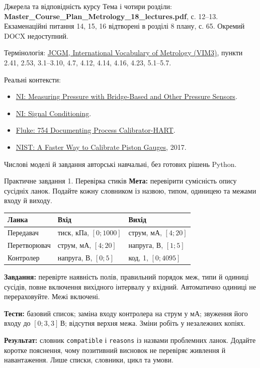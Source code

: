 \documentclass[aspectratio=169,11pt]{beamer}
\newcommand{\unit}[1]{\,\text{#1}}
\begin{document}
\begin{frame}{Джерела та відповідність курсу}
\small
Тема і чотири розділи: \textbf{Master\_Course\_Plan\_Metrology\_18\_lectures.pdf}, с. 12--13. Екзаменаційні питання 14, 15, 16 відтворені в розділі 8 плану, с. 65. Окремий DOCX недоступний.
\medskip

Термінологія: \href{https://jcgm.bipm.org/vim/en/}{JCGM, International Vocabulary of Metrology (VIM3)}, пункти 2.41, 2.53, 3.1--3.10, 4.7, 4.12, 4.14, 4.16, 4.23, 5.1--5.7.
\medskip

Реальні контексти:
\begin{itemize}
\item \href{https://www.ni.com/en/shop/data-acquisition/sensor-fundamentals/measuring-pressure-with-bridge-based-and-other-pressure-sensors.html}{NI: Measuring Pressure with Bridge-Based and Other Pressure Sensors}.
\item \href{https://www.ni.com/docs/en-US/bundle/ni-daqmx/page/sigcon.html}{NI: Signal Conditioning}.
\item \href{https://www.fluke.com/en-gb/product/calibration-tools/multifunction-calibrators/fluke-754}{Fluke: 754 Documenting Process Calibrator-HART}.
\item \href{https://www.nist.gov/news-events/news/2017/05/faster-way-calibrate-piston-gauges}{NIST: A Faster Way to Calibrate Piston Gauges}, 2017.
\end{itemize}
Числові моделі й завдання авторські навчальні, без готових рішень Python.
\end{frame}

\appendix
\begin{frame}[t]{Практичне завдання 1. Перевірка стиків}
\small
\textbf{Мета:} перевірити сумісність опису сусідніх ланок. Подайте кожну словником із назвою, типом, одиницею та межами входу й виходу.
\begin{center}\begin{tabular}{lll}\toprule
Ланка & Вхід & Вихід\\\midrule
Передавач & тиск, кПа, $[0;1000]$ & струм, мА, $[4;20]$\\
Перетворювач & струм, мА, $[4;20]$ & напруга, В, $[1;5]$\\
Контролер & напруга, В, $[0;5]$ & код, 1, $[0;4095]$\\\bottomrule
\end{tabular}\end{center}
\textbf{Завдання:} перевірте наявність полів, правильний порядок меж, типи й одиниці сусідів, повне включення вихідного інтервалу у вхідний. Автоматично одиниці не перераховуйте. Межі включені.
\par\medskip
\textbf{Тести:} базовий список; заміна входу контролера на струм у мА; звуження його входу до $[0;3{,}3]\unit{В}$; відсутня верхня межа. Зміни робіть у незалежних копіях.
\par\medskip
\textbf{Результат:} словник \texttt{compatible} і \texttt{reasons} із назвами проблемних ланок. Додайте коротке пояснення, чому позитивний висновок не перевіряє живлення й навантаження. Лише списки, словники, цикл та умови.
\end{frame}
\end{document}
